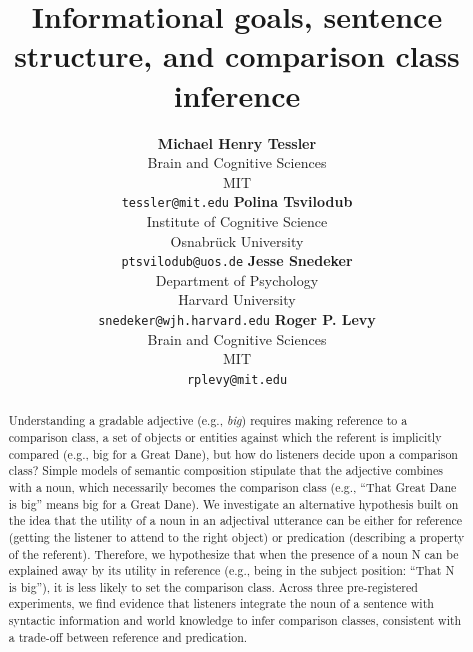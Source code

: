 \documentclass[10pt,letterpaper]{article}
\title{Informational goals, sentence structure, and comparison class inference}
\author{{\large \bf Michael Henry Tessler}  \\  Brain and Cognitive Sciences \\   MIT  \\  \texttt{tessler@mit.edu}
         \And  
         {\large \bf Polina Tsvilodub}  \\ Institute of Cognitive Science \\   Osnabrück University  \\  \texttt{ptsvilodub@uos.de}
          \And
         {\large \bf Jesse Snedeker}  \\ Department of Psychology \\   Harvard University  \\  \texttt{snedeker@wjh.harvard.edu}
                   \And
         {\large \bf Roger P. Levy} \\ Brain and Cognitive Sciences \\   MIT  \\  \texttt{rplevy@mit.edu}}
\begin{document}
\maketitle

\begin{abstract}
   
Understanding a gradable adjective (e.g., \emph{big}) requires making reference to a comparison class, a set of objects or entities against which the referent is implicitly compared (e.g., big for a Great Dane), but how do listeners decide upon a comparison class? Simple models of semantic composition stipulate that the adjective combines with a noun, which necessarily becomes the comparison class (e.g., ``That Great Dane is big'' means big for a Great Dane). We investigate an alternative hypothesis built on the idea that the utility of a noun in an adjectival utterance can be either for reference (getting the listener to attend to the right object) or predication (describing a property of the referent). Therefore, we hypothesize that when the presence of a noun N can be explained away by its utility in reference (e.g., being in the subject position: ``That N is big''), it is less likely to set the comparison class. Across three pre-registered experiments, we find evidence that listeners integrate the noun of a sentence with syntactic information and world knowledge to infer comparison classes, consistent with a trade-off between reference and predication. 
 
   
   
\end{abstract}
\end{document}
